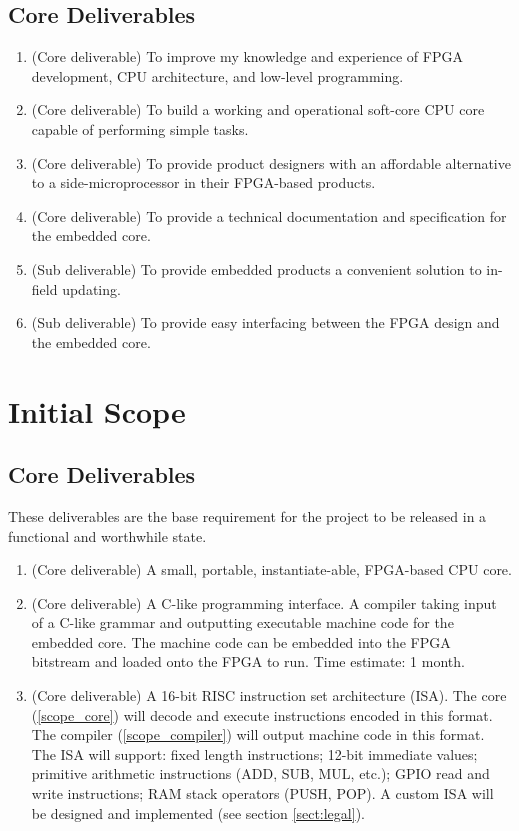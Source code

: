 \documentclass[11pt,a4paper]{article}
\begin{document}
\subsection{Core Deliverables}
\begin{enumerate}
\item{(Core deliverable) To improve my knowledge and experience of FPGA  development, CPU architecture, and low-level programming.}
\item{(Core deliverable) To build a working and operational soft-core CPU core capable of performing simple tasks.}
\item{(Core deliverable) To provide product designers with an affordable alternative to a side-microprocessor in their FPGA-based products.}
\item{(Core deliverable) To provide a technical documentation and specification for the embedded core.}
\item{(Sub deliverable) To provide embedded products a convenient solution to in-field updating.}
\item{(Sub deliverable) To provide easy interfacing between the FPGA design and the embedded core.}  
\end{enumerate}

\section{Initial Scope}
\subsection{Core Deliverables}
These deliverables are the base requirement for the project to be released in a functional and worthwhile state.

\begin{enumerate}
\item{(Core deliverable) A small, portable, instantiate-able, FPGA-based CPU core.}\label{scope_core}

\item{(Core deliverable) A C-like programming interface. A compiler taking input of a C-like grammar and outputting executable machine code for the embedded core. The machine code can be embedded into the FPGA bitstream and loaded onto the FPGA to run. Time estimate: 1 month.}\label{scope_compiler}

\item{(Core deliverable) A 16-bit RISC instruction set architecture (ISA). The core (\ref{scope_core}) will decode and execute instructions encoded in this format. The compiler (\ref{scope_compiler}) will output machine code in this format. The ISA will support: fixed length instructions; 12-bit immediate values; primitive arithmetic instructions (ADD, SUB, MUL, etc.); GPIO read and write instructions; RAM stack operators (PUSH, POP). A custom ISA will be designed and implemented (see section \ref{sect:legal}).
}
\end{enumerate}
\end{document}
